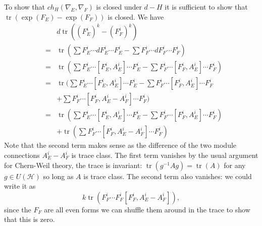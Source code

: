 \documentclass[a4paper,reqno]{amsart}
\DeclareMathOperator{\tr}{tr}
\theoremstyle{plain}
\theoremstyle{definition}
\theoremstyle{remark}
\numberwithin{equation}{section}
\numberwithin{figure}{section}
\newcommand{\<}{\langle}
\renewcommand{\>}{\rangle}
\begin{document}
To show that $ch_H(\nabla_E,\nabla_F)$ is closed under $d-H$ it is 
sufficient to show that $\tr(\exp(F_E) - 
\exp(F_F))$ is closed.  
We have   
\begin{eqnarray*} 
&   & d\tr((F_E^i)^k - (F_F^i)^k) \\ 
& = & \tr(\sum F_E^i \cdots dF_E^i 
\cdots F_E^i - \sum F_F^i \cdots 
dF_F^i \cdots F_F^i)              \\ 
& = & \tr(\sum F_E^i \cdots [F_E^i, 
A_E^i]\cdots F_E^i - \sum 
F_F^i \cdots [F_F^i,A_E^i] 
\cdots F_F^i)                                 \\  
& = & \tr(\sum F_E^i \cdots [F_E^i, 
A_E^i] \cdots F_E^i - \sum F_F^i 
\cdots [F_F^i,A_E^i]\cdots F_F^i \\  
&   & + \sum F_F^i \cdots [F_F^i,A_E^i 
- A_F^i]\cdots F_F^i)                    \\ 
& = & \tr(\sum F_E^i\cdots [F_E^i, 
A_E^i]\cdots F_E^i - \sum F_F^i 
\cdots [F_F^i,A_E^i]\cdots F_F^i) \\  
&    & + \tr(\sum F_F^i \cdots [F_F^i, 
A_E^i - A_F^i]\cdots F_F^i)           
\end{eqnarray*} 
Note that the second term makes sense as the difference of the 
two module connections $A_E^i - A_F^i$ is 
trace class.  The first term vanishes by the usual argument 
for Chern-Weil theory, the trace is invariant: $\tr(g^{-1}Ag) 
= \tr(A)$ for any $g \in U(\mathcal{H})$ so long as $A$ is trace class.  
The second term also vanishes: we could write it as 
$$
k\tr(F_F^i \cdots F_F^i[F_F^i, 
A_E^i -A_F^i]),  
$$
since the $F_F$ are all even forms we can shuffle 
them around in the trace to show that this is zero.  
\end{document}
